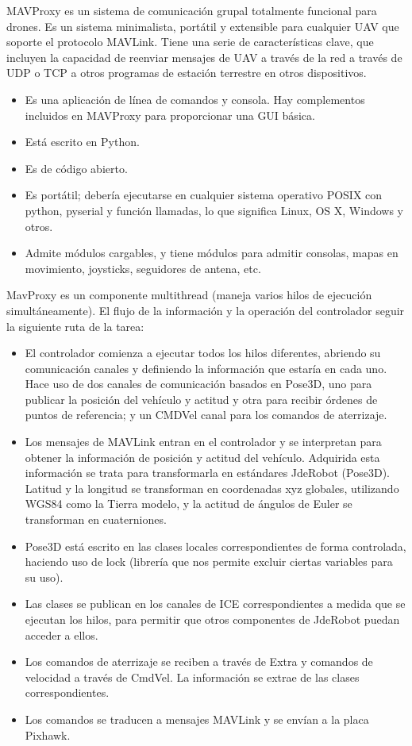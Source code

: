 MAVProxy es un sistema de comunicación grupal totalmente funcional  para drones. Es un sistema minimalista, portátil y extensible para cualquier UAV que soporte el protocolo MAVLink. Tiene una serie de características clave, que incluyen la capacidad de reenviar mensajes de UAV a través de la red a través de UDP o TCP a otros programas de estación terrestre en otros dispositivos.

\begin{itemize}
\item Es una aplicación de línea de comandos y consola. Hay complementos incluidos en MAVProxy para proporcionar una GUI básica.
\item Está escrito en Python.
\item Es de código abierto.
\item Es portátil; debería ejecutarse en cualquier sistema operativo POSIX con python, pyserial y función llamadas, lo que significa Linux, OS X, Windows y otros.
\item Admite módulos cargables, y tiene módulos para admitir consolas, mapas en movimiento, joysticks, seguidores de antena, etc.
\end{itemize}

MavProxy es un componente multithread (maneja varios hilos de ejecución simultáneamente). El flujo de la información y la operación del controlador seguir la siguiente ruta de la tarea:

\begin{itemize}
\item El controlador comienza a ejecutar todos los hilos diferentes, abriendo su comunicación canales y definiendo la información que estaría en cada uno. Hace uso de dos canales de comunicación basados en Pose3D, uno para publicar la posición del vehículo y actitud y otra para recibir órdenes de puntos de referencia; y un CMDVel canal para los comandos de aterrizaje.
\item Los mensajes de MAVLink entran en el controlador y se interpretan para obtener la información de posición y actitud del vehículo. Adquirida esta  información se trata para transformarla en estándares JdeRobot (Pose3D). Latitud y la longitud se transforman en coordenadas xyz globales, utilizando WGS84 como la Tierra modelo, y la actitud de ángulos de Euler se transforman en cuaterniones.
\item Pose3D está escrito en las clases locales correspondientes de forma controlada, haciendo uso de lock (librería que nos permite excluir ciertas variables para su uso).
\item Las clases se publican en los canales de ICE correspondientes a medida que se ejecutan los hilos, para permitir que otros componentes de JdeRobot puedan acceder a ellos.
\item Los comandos de aterrizaje se reciben a través de Extra y comandos de velocidad a través de CmdVel. La información se extrae de las clases correspondientes.
\item Los comandos se traducen a mensajes MAVLink y se envían a la placa Pixhawk.
\end{itemize}

